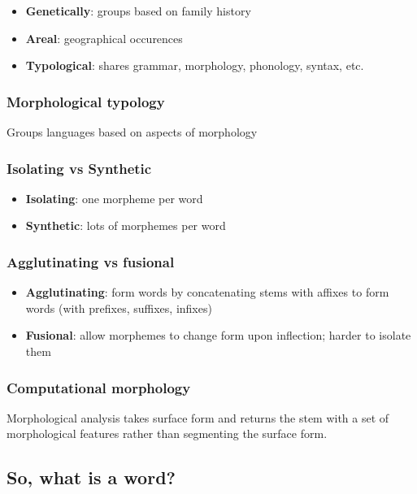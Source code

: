 \documentclass[11pt]{article}
\begin{document}
\begin{itemize}
	\item \textbf{Genetically}: groups based on family history
	\item \textbf{Areal}: geographical occurences
	\item \textbf{Typological}: shares grammar, morphology, phonology, syntax,
	      etc.
\end{itemize}

\subsubsection{Morphological typology}

Groups languages based on aspects of morphology

\subsubsection*{Isolating vs Synthetic}

\begin{itemize}
	\item \textbf{Isolating}: one morpheme per word
	\item \textbf{Synthetic}: lots of morphemes per word
\end{itemize}

\subsubsection*{Agglutinating vs fusional}

\begin{itemize}
	\item \textbf{Agglutinating}: form words by concatenating stems with affixes
	      to form words (with prefixes, suffixes, infixes)
	\item \textbf{Fusional}: allow morphemes to change form upon inflection;
	      harder to isolate them
\end{itemize}

\subsubsection*{Computational morphology}

Morphological analysis takes surface form and returns the stem with a set of
morphological features rather than segmenting the surface form.

\subsection{So, what is a word?}
\end{document}
